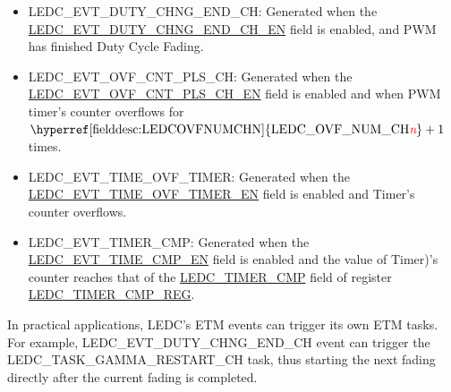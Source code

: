 \documentclass[main\_\_EN.tex]{subfiles}
\begin{document}
\begin{itemize}
    \item LEDC\_EVT\_DUTY\_CHNG\_END\_CH: Generated when the  \hyperref[fielddesc:LEDCEVTDUTYCHNGENDCHNEN]{LEDC\_EVT\_DUTY\_CHNG\_END\_CH\_EN} field is enabled, and PWM has finished Duty Cycle Fading.
    \item LEDC\_EVT\_OVF\_CNT\_PLS\_CH: Generated when the  \hyperref[fielddesc:LEDCEVTOVFCNTPLSCHNEN]{LEDC\_EVT\_OVF\_CNT\_PLS\_CH\_EN} field is enabled and when PWM timer's counter overflows for $ \textrm{\hyperref[fielddesc:LEDCOVFNUMCHN]{LEDC\_OVF\_NUM\_CH\regindex{n}}} + 1 $ times.
    \item LEDC\_EVT\_TIME\_OVF\_TIMER: Generated when the \hyperref[fielddesc:LEDCEVTTIMEOVFTIMERXEN]{LEDC\_EVT\_TIME\_OVF\_TIMER\_EN} field is enabled and Timer's counter overflows.
    \item LEDC\_EVT\_TIMER\_CMP: Generated when the \hyperref[fielddesc:LEDCEVTTIMENCMPEN]{LEDC\_EVT\_TIME\_CMP\_EN} field is enabled and the value of Timer)'s counter reaches that of the \hyperref[fielddesc:LEDCTIMERXCMP]{LEDC\_TIMER\_CMP} field of register \hyperref[regdesc:LEDCTIMERXCMPREG]{LEDC\_TIMER\_CMP\_REG}.
\end{itemize}

In practical applications, LEDC's ETM events can trigger its own ETM tasks. For example, LEDC\_EVT\_DUTY\_CHNG\_END\_CH event can trigger the LEDC\_TASK\_GAMMA\_RESTART\_CH task, thus starting the next fading directly after the current fading is completed.
\end{document}

